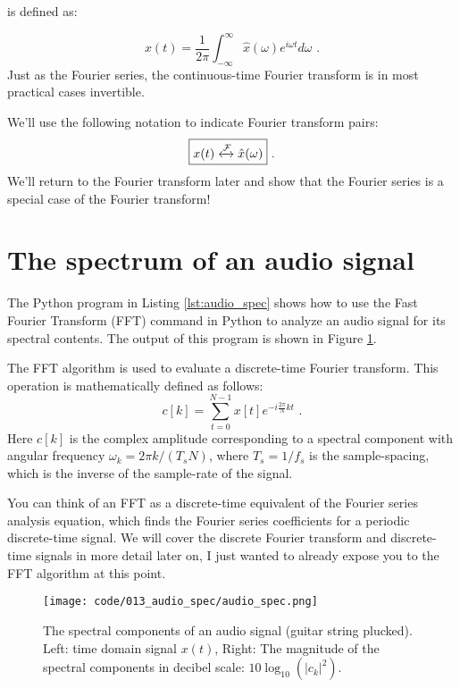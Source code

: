  is defined as:

\begin{equation}
  \boxed{
    x(t) = \frac{1}{2\pi}\int_{-\infty}^{\infty} \hat{x}(\omega) e^{i\omega t}d\omega
  } \,\,.
\end{equation}
Just as the Fourier series, the continuous-time Fourier transform is in most practical cases invertible.

We'll use the following notation to indicate Fourier transform pairs:
\begin{equation}
  \boxed{
    x(t) \xleftrightarrow{\mathcal{F}} \hat{x}(\omega)
  } \,\,.
\end{equation}
We'll return to the Fourier transform later and show that the Fourier series is a special case of the Fourier transform!

\section{The spectrum of an audio signal}

The Python program in Listing \ref{lst:audio_spec} shows how to use the Fast Fourier Transform (FFT)
command in Python to analyze an audio signal for its spectral contents.
The output of this program is shown in Figure \ref{fig:audio_spec}.

The FFT algorithm is used to evaluate a discrete-time Fourier transform.
This operation is mathematically defined as follows:
\begin{equation}
  c[k] = \sum_{t=0}^{N-1} x[t] e^{-i\frac{2\pi}{N}kt} \,\,.
\end{equation}
Here $c[k]$ is the complex amplitude corresponding to a spectral component with angular frequency $\omega_k = 2\pi k/(T_s N)$, where $T_s=1/f_s$ is the sample-spacing, which is the inverse of the sample-rate of the signal.

You can think of an FFT as a discrete-time equivalent of the Fourier series analysis equation, 
which finds the Fourier series coefficients for a periodic discrete-time signal. 
We will cover the discrete Fourier transform and discrete-time signals in more detail later on, 
I just wanted to already expose you to the FFT algorithm at this point.



\begin{figure}
  \begin{center}
    \texttt{[image: code/013\_audio\_spec/audio\_spec.png]}
  \end{center}
  \caption{The spectral components of an audio signal (guitar string plucked). Left: time domain signal $x(t)$, Right: The magnitude of the spectral components in decibel scale: $10\log_{10}(|c_k|^2)$.}
  \label{fig:audio_spec}
\end{figure}
